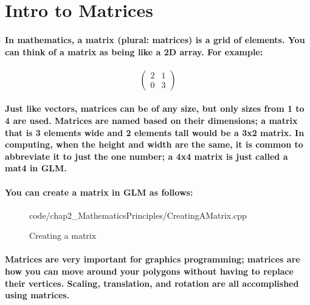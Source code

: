 \section{Intro to Matrices}

\paragraph{
    In mathematics, a matrix (plural: matrices) is a grid of elements. You can think of a matrix as being like a 2D array. For example:
}

\paragraph{
    \begin{equation*}
    \begin{pmatrix}
    2 & 1\\
    0 & 3
    \end{pmatrix}
    \end{equation*}
}

\paragraph{
    Just like vectors, matrices can be of any size, but only sizes from 1 to 4 are used. Matrices are named based on their dimensions; a matrix that is 3 elements wide and 2 elements tall would be a 3x2 matrix. In computing, when the height and width are the same, it is common to abbreviate it to just the one number; a 4x4 matrix is just called a mat4 in GLM.
}

\paragraph{
    You can create a matrix in GLM as follows:
}

\begin{frame}{}
    \begin{figure}[ht]
    \centering
    \colorbox{backgroundcolor}{
        \parbox{0.9\textwidth}{
            
            {code/chap2_MathematicsPrinciples/CreatingAMatrix.cpp}
        }
    }
    \caption{Creating a matrix}
    \label{fig:creating_a_matrix}
    \end{figure}
\end{frame}

\paragraph{
    Matrices are very important for graphics programming; matrices are how you can move around your polygons without having to replace their vertices. Scaling, translation, and rotation are all accomplished using matrices.
}

